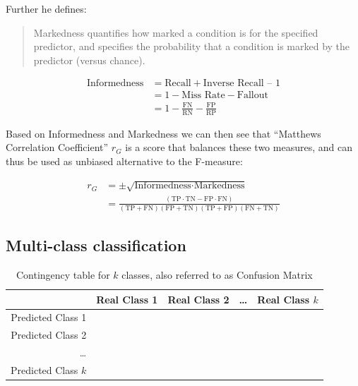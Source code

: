 Further he defines:
\blockquote{Markedness quantifies how marked a condition is for the specified predictor, and specifies the probability that a condition is marked by the predictor (versus chance).}

\begin{equation}
  \begin{split}
  \text{Informedness} &= \text{Recall} + \text{Inverse Recall} \text{ – } 1 \\
  &= 1 - \text{Miss Rate} - \text{Fallout} \\
  &= 1 - \frac{\text{FN}}{ \text{RN}} - \frac{\text{FP}}{\text{RP}}
  \end{split}
\end{equation}

Based on Informedness and Markedness we can then see that ``Matthews Correlation Coefficient'' $r_{G}$ is a score that balances these two measures, and can thus be used as unbiased alternative to the F-measure:

\begin{equation}
  \begin{split}
  r_{G} &= \pm \sqrt{\text{Informedness} \cdot \text{Markedness}} \\
  &= \frac{(\text{TP} \cdot \text{TN} - \text{FP} \cdot \text{FN})}{(\text{TP} + \text{FN})(\text{FP} + \text{TN})(\text{TP} + \text{FP})(\text{FN} + \text{TN})}
\end{split}
\end{equation}

\subsection{Multi-class classification}


\begin{center}
  \begin{table}[h]
  \begin{tabular}{r | c c c c }
    & Real Class 1 & Real Class 2 & \ldots & Real Class $k$ \\
    \hline
    Predicted Class 1    & & & \\
    Predicted Class 2    & & & \\
    \ldots               & & & \\
    Predicted Class $k$  & & & \\
  \end{tabular}
  \caption{Contingency table for $k$ classes, also referred to as Confusion Matrix}
\label{table:contingency-table-k2}
\end{table}
\end{center}



